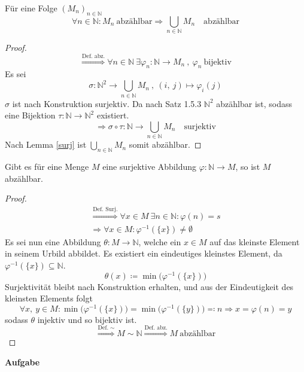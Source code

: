 \documentclass[a4paper, 12pt]{scrartcl}
\newcounter{taski}
\newcommand{\task}{\stepcounter{taski}\textbf{Aufgabe \arabic{taski}}\\}
\newcommand{\defimpl}[1]{\stackrel{\text{Def.}\;#1}{\Longrightarrow}}
\newcommand{\txtimpl}[1]{\stackrel{\text{#1}}{\Longrightarrow}}
\begin{document}
\begin{theorem}
Für eine Folge $(M_n)_{n \in \mathbb{N}}$
	\[ \forall n \in \mathbb{N} : M_n\ \text{abzählbar} \Rightarrow \bigcup_{n \in \mathbb{N}}M_n\quad\text{abzählbar}\]
\end{theorem}
\begin{proof}
\[ \txtimpl{Def. abz.} \forall n \in \mathbb{N}\ \exists \varphi_n:\mathbb{N} \rightarrow M_n\ ,\ \varphi_n\ \text{bijektiv} \]
Es sei
\[ \sigma : \mathbb{N}^2 \rightarrow \bigcup_{n \in \mathbb{N}}M_n\ ,\ (i,\ j) \mapsto \varphi_i(j) \]
$\sigma$ ist nach Konstruktion surjektiv. Da nach Satz 1.5.3 $\mathbb{N}^2$ abzählbar ist, sodass eine Bijektion $\tau : \mathbb{N} \rightarrow \mathbb{N}^2$ existiert.
\[ \Rightarrow \sigma \circ \tau : \mathbb{N} \rightarrow \bigcup_{n \in \mathbb{N}}M_n \quad \text{surjektiv} \]
Nach Lemma \ref{surj} ist $\bigcup_{n \in \mathbb{N}}M_n$ somit abzählbar.
\end{proof}

\begin{lemma}\label{surj}
	Gibt es für eine Menge $M$ eine surjektive Abbildung $\varphi:\mathbb{N} \rightarrow M$, so ist $M$ abzählbar.	
\end{lemma}
\begin{proof}
\renewcommand*{\thefootnote}{\textdagger}
\begin{gather*}
	\txtimpl{Def. Surj.} \forall x \in M \ \exists n \in \mathbb{N} : \varphi(n) = s \\
	\Rightarrow \forall x \in M : \varphi^{-1}(\{x\}) \neq \emptyset \tag*{\footnotemark}
\end{gather*}
Es sei nun eine Abbildung $\theta: M \rightarrow \mathbb{N}$, welche ein $x \in M$ auf das kleinste Element in seinem Urbild abbildet. Es existiert ein eindeutiges kleinstes Element, da $\varphi^{-1}(\{x\}) \subseteq \mathbb{N}$.
\[ \theta(x) \coloneqq \min\big(\varphi^{-1}(\{x\})\big) \]
Surjektivität bleibt nach Konstruktion erhalten, und aus der Eindeutigkeit des kleinsten Elements folgt
\[ \forall x,\ y \in M : \min\big(\varphi^{-1}(\{x\})\big) = \min\big(\varphi^{-1}(\{y\})\big) \eqqcolon n \Rightarrow x = \varphi(n) = y\]
sodass $\theta$ injektiv und so bijektiv ist.
\[ \defimpl{\sim} M \sim \mathbb{N} \txtimpl{Def. abz.} M\ \text{abzählbar} \]
\end{proof}
\newpage
\task
\end{document}
